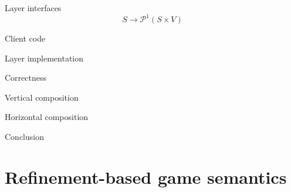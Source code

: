 \documentclass[aspectratio=141]{beamer}
\begin{document}
\begin{frame}{Layer interfaces}
\[
    S \rightarrow \mathcal{P}^1(S \times V)
\]
\end{frame}

\begin{frame}{Client code}

\end{frame}

\begin{frame}{Layer implementation}

\end{frame}

\begin{frame}{Correctness}

\end{frame}

\begin{frame}{Vertical composition}

\end{frame}

\begin{frame}{Horizontal composition}

\end{frame}

\begin{frame}{Conclusion}

\end{frame}


\section{Refinement-based game semantics} %
\end{document}
